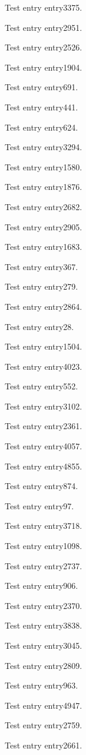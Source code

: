 Test entry \gls{entry3375}.

Test entry \gls{entry2951}.

Test entry \gls{entry2526}.

Test entry \gls{entry1904}.

Test entry \gls{entry691}.

Test entry \gls{entry441}.

Test entry \gls{entry624}.

Test entry \gls{entry3294}.

Test entry \gls{entry1580}.

Test entry \gls{entry1876}.

Test entry \gls{entry2682}.

Test entry \gls{entry2905}.

Test entry \gls{entry1683}.

Test entry \gls{entry367}.

Test entry \gls{entry279}.

Test entry \gls{entry2864}.

Test entry \gls{entry28}.

Test entry \gls{entry1504}.

Test entry \gls{entry4023}.

Test entry \gls{entry552}.

Test entry \gls{entry3102}.

Test entry \gls{entry2361}.

Test entry \gls{entry4057}.

Test entry \gls{entry4855}.

Test entry \gls{entry874}.

Test entry \gls{entry97}.

Test entry \gls{entry3718}.

Test entry \gls{entry1098}.

Test entry \gls{entry2737}.

Test entry \gls{entry906}.

Test entry \gls{entry2370}.

Test entry \gls{entry3838}.

Test entry \gls{entry3045}.

Test entry \gls{entry2809}.

Test entry \gls{entry963}.

Test entry \gls{entry4947}.

Test entry \gls{entry2759}.

Test entry \gls{entry2661}.

